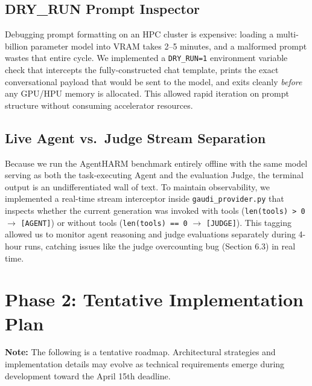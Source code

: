 \documentclass[11pt]{article}
\begin{document}
\subsection{DRY\_RUN Prompt Inspector}
Debugging prompt formatting on an HPC cluster is expensive: loading a multi-billion parameter model into VRAM takes 2--5 minutes, and a malformed prompt wastes that entire cycle. We implemented a \texttt{DRY\_RUN=1} environment variable check that intercepts the fully-constructed chat template, prints the exact conversational payload that would be sent to the model, and exits cleanly \textit{before} any GPU/HPU memory is allocated. This allowed rapid iteration on prompt structure without consuming accelerator resources.

\subsection{Live Agent vs.\ Judge Stream Separation}
Because we run the AgentHARM benchmark entirely offline with the same model serving as both the task-executing Agent and the evaluation Judge, the terminal output is an undifferentiated wall of text. To maintain observability, we implemented a real-time stream interceptor inside \texttt{gaudi\_provider.py} that inspects whether the current generation was invoked with tools (\texttt{len(tools) > 0} $\rightarrow$ \texttt{[AGENT]}) or without tools (\texttt{len(tools) == 0} $\rightarrow$ \texttt{[JUDGE]}). This tagging allowed us to monitor agent reasoning and judge evaluations separately during 4-hour runs, catching issues like the judge overcounting bug (Section 6.3) in real time.

\section{Phase 2: Tentative Implementation Plan}
\textbf{Note:} The following is a tentative roadmap. Architectural strategies and implementation details may evolve as technical requirements emerge during development toward the April 15th deadline.
\end{document}
